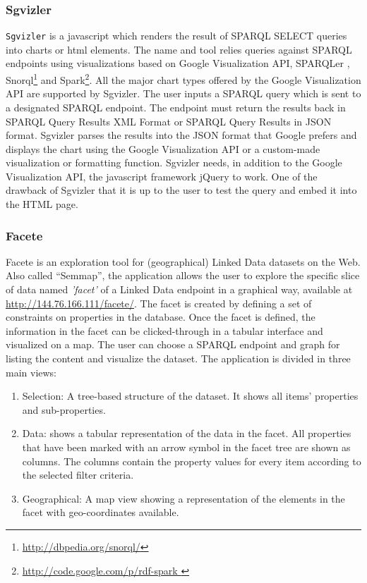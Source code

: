 \subsubsection{Sgvizler}
\texttt{Sgvizler} \cite{Martin2012} is a javascript which renders the result of SPARQL SELECT queries into charts or html elements. The name and tool relies queries against SPARQL endpoints using visualizations based on Google Visualization API, SPARQLer , Snorql\footnote{\url{http://dbpedia.org/snorql/}} and Spark\footnote{\url{http://code.google.com/p/rdf-spark }}. All the major chart types offered by the Google Visualization API are supported by Sgvizler. The user inputs a SPARQL query which is sent to a designated SPARQL endpoint. The endpoint must return the results back in SPARQL Query Results XML Format or SPARQL Query Results in JSON format. Sgvizler parses the results into the JSON format that Google prefers and displays the chart using the Google Visualization API or a custom-made visualization or formatting function. Sgvizler needs, in addition to the Google Visualization API, the javascript framework jQuery  to work. One of the drawback of Sgvizler that it is up to the user to test the query and embed it into the HTML page.
 
\subsubsection{Facete}
Facete \cite{facete:2014} is an exploration tool for (geographical) Linked Data datasets on the Web. Also called ``Semmap'', the application allows the user to explore the specific slice of data named \textit{'facet'}  of a Linked Data endpoint in a graphical way, available at \url{http://144.76.166.111/facete/}. The facet is created by defining a set of constraints on properties in the database. Once the facet is defined, the information in the facet can be clicked-through in a tabular interface and visualized on a map. The user can choose a SPARQL endpoint and graph for listing the content and visualize the dataset. The application is divided in three main views:
\begin{enumerate}
\item Selection: A tree-based structure of the dataset. It shows all items' properties and sub-properties. 
\item  Data: shows a tabular representation of the data in the facet. All properties that have been marked with an arrow symbol in the facet tree are shown as columns. The columns contain the property values for every item according to the selected filter criteria.
\item Geographical: A map view showing a representation of the elements in the facet with geo-coordinates available.
\end{enumerate}

